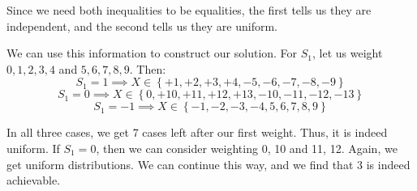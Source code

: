 \documentclass[a4paper]{article}
\begin{document}
{    Since we need both inequalities to be equalities, the first tells us they are independent, and the second tells us they are uniform.

    We can use this information to construct our solution. For $S_1$, let us weight $0, 1, 2, 3, 4$ and $5, 6, 7, 8, 9$. Then:
    \[S_1 = 1 \implies X \in \left\{+1, +2, +3, +4, -5, -6, -7, -8, -9\right\}\]
    \[S_1 = 0 \implies X \in \left\{0, +10, +11, +12, +13, -10, -11, -12, -13\right\}\]
    \[S_1 = -1 \implies X \in \left\{-1, -2, -3, -4, 5, 6, 7, 8, 9\right\}\]

    In all three cases, we get 7 cases left after our first weight. Thus, it is indeed uniform. If $S_1 = 0$, then we can consider weighting 0, 10 and 11, 12. Again, we get uniform distributions. We can continue this way, and we find that 3 is indeed achievable.
}
\end{document}
